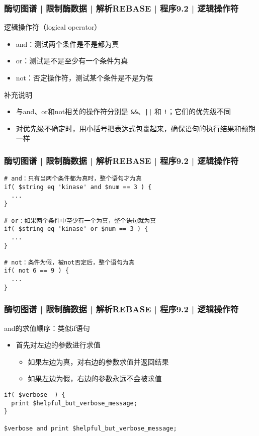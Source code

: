 \begin{frame}[fragile]
  \frametitle{酶切图谱 | 限制酶数据 | 解析REBASE | 程序9.2 | \alert{逻辑操作符}}
  \begin{block}{逻辑操作符（logical operator）}
    \begin{itemize}
      \item and：测试两个条件是不是都为真
      \item or：测试是不是至少有一个条件为真
      \item not：否定操作符，测试某个条件是不是为假
    \end{itemize}
  \end{block}
  \pause
  \begin{block}{补充说明}
    \begin{itemize}
      \item 与and、or和not相关的操作符分别是 \verb|&&|、\verb=||= 和 \verb|!|；它们的优先级不同
      \item 对优先级不确定时，用小括号把表达式包裹起来，确保语句的执行结果和预期一样
    \end{itemize}
  \end{block}
\end{frame}

\begin{frame}[fragile]
  \frametitle{酶切图谱 | 限制酶数据 | 解析REBASE | 程序9.2 | \alert{逻辑操作符}}
\begin{lstlisting}
# and：只有当两个条件都为真时，整个语句才为真
if( $string eq 'kinase' and $num == 3 ) {
  ...
}

# or：如果两个条件中至少有一个为真，整个语句就为真
if( $string eq 'kinase' or $num == 3 ) {
  ...
}

# not：条件为假，被not否定后，整个语句为真
if( not 6 == 9 ) {
  ...
}
\end{lstlisting}
\end{frame}

\begin{frame}[fragile]
  \frametitle{酶切图谱 | 限制酶数据 | 解析REBASE | 程序9.2 | \alert{逻辑操作符}}
  \begin{block}{and的求值顺序：类似if语句}
    \begin{itemize}
      \item 首先对左边的参数进行求值
	\begin{itemize}
	  \item 如果左边为真，对右边的参数求值并返回结果
	  \item 如果左边为假，右边的参数永远不会被求值
	\end{itemize}
    \end{itemize}
  \end{block}
  \pause
\begin{lstlisting}
if( $verbose  ) {
  print $helpful_but_verbose_message;
}

$verbose and print $helpful_but_verbose_message;
\end{lstlisting}
\end{frame}

